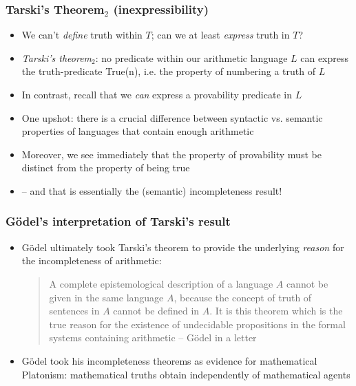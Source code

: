 \begin{frame}
\frametitle{Tarski's Theorem$_2$ (inexpressibility)}

\begin{itemize}[<+->]

\item We can't \textit{define} truth within $T$; can we at least \textit{express} truth in $T$?

\item \emph{Tarski's theorem$_2$}: no predicate within our arithmetic language $L$ can express the truth-predicate \textrm{True(n)}, i.e. the property of numbering a truth of $L$

\item In contrast, recall that we \textit{can} express a provability predicate in $L$

\item One upshot: there is a crucial difference between syntactic vs. semantic properties of languages that contain enough arithmetic

\item Moreover, we see immediately that the property of provability must be distinct from the property of being true
\item[] -- and that is essentially the (semantic) incompleteness result! 

\end{itemize}
\end{frame}

\begin{frame}
\frametitle{G\"odel's interpretation of Tarski's result}

\begin{itemize}[<+->]

\item G\"odel ultimately took Tarski's theorem to provide the underlying \textit{reason} for the incompleteness of arithmetic: 

\medskip 

\pause

\begin{quotation}

A complete epistemological description of a language $A$ cannot be given in the same language $A$, because the concept of truth of sentences in $A$ cannot be defined in $A$. It is this theorem which is the true reason for the existence of undecidable propositions in the formal systems containing arithmetic -- G\"odel in a letter
\end{quotation}


\item G\"odel took his incompleteness theorems as evidence for mathematical Platonism: mathematical truths obtain independently of mathematical agents

\end{itemize}


\end{frame}

